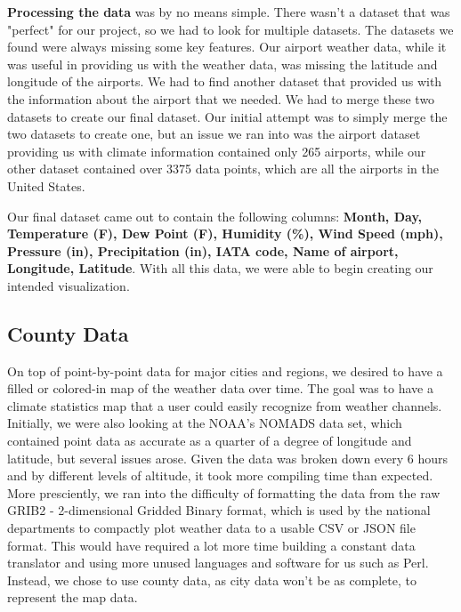 \documentclass[10pt,twocolumn,twoside]{opticajnl}
\begin{document}
\textbf{Processing the data} was by no means simple. There wasn't a dataset that was "perfect" for our project, so we had to look for multiple datasets. The datasets we found were always missing some key features. Our airport weather data, while it was useful in providing us with the weather data, was missing the latitude and longitude of the airports. We had to find another \cite{alaswad_2021_us} dataset that provided us with the information about the airport that we needed. We had to merge these two datasets to create our final dataset. Our initial attempt was to simply merge the two datasets to create one, but an issue we ran into was the airport dataset providing us with climate information contained only 265 airports, while our other dataset contained over 3375 data points, which are all the airports in the United States.

Our final dataset came out to contain the following columns: \textbf{Month, Day, Temperature (F), Dew Point (F), Humidity (\%), Wind Speed (mph), Pressure (in), Precipitation (in), IATA code, Name of airport, Longitude, Latitude}. With all this data, we were able to begin creating our intended visualization.

\subsection{County Data}

On top of point-by-point data for major cities and regions, we desired to have a filled or colored-in map of the weather data over time. The goal was to have a climate statistics map that a user could easily recognize from weather channels. Initially, we were also looking at the NOAA's NOMADS \cite{noaa_nomads} data set, which contained point data as accurate as a quarter of a degree of longitude and latitude, but several issues arose. Given the data was broken down every 6 hours and by different levels of altitude, it took more compiling time than expected. More presciently, we ran into the difficulty of formatting the data from the raw GRIB2 - 2-dimensional Gridded Binary format, which is used by the national departments to compactly plot weather data to a usable CSV or JSON file format. This would have required a lot more time building a constant data translator and using more unused languages and software for us such as Perl. Instead, we chose to use county data, as city data won't be as complete, to represent the map data.
\end{document}

